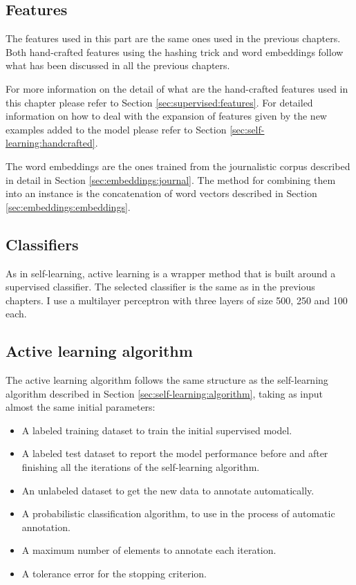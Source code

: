 \subsection{Features}

The features used in this part are the same ones used in the previous chapters.
Both hand-crafted features using the hashing trick and word embeddings follow
what has been discussed in all the previous chapters.

For more information on the detail of what are the hand-crafted features used
in this chapter please refer to Section \ref{sec:supervised:features}. For
detailed information on how to deal with the expansion of features given by the
new examples added to the model please refer to Section
\ref{sec:self-learning:handcrafted}.

The word embeddings are the ones trained from the journalistic corpus described
in detail in Section \ref{sec:embeddings:journal}. The method for combining
them into an instance is the concatenation of word vectors described in Section
\ref{sec:embeddings:embeddings}.

\subsection{Classifiers}

As in self-learning, active learning is a wrapper method that is built around a
supervised classifier. The selected classifier is the same as in the previous
chapters. I use a multilayer perceptron with three layers of size 500, 250 and
100 each.

\subsection{Active learning algorithm}\label{sec:active:algorithm}

The active learning algorithm follows the same structure as the self-learning
algorithm described in Section \ref{sec:self-learning:algorithm}, taking as
input almost the same initial parameters:

\begin{itemize}
  \item A labeled training dataset to train the initial supervised model.
  \item A labeled test dataset to report the model performance before and after
    finishing all the iterations of the self-learning algorithm.
  \item An unlabeled dataset to get the new data to annotate automatically.
  \item A probabilistic classification algorithm, to use in the process of
    automatic annotation.
  \item A maximum number of elements to annotate each iteration.
  \item A tolerance error for the stopping criterion.
\end{itemize}

